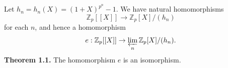 Let $h_n = h_n(X) = (1+X)^{p^n} - 1$. We have natural homomorphisms
$$\mathbb{Z}_p[[X]] \to \mathbb{Z}_p[X]/(h_n)$$
for each $n$, and hence a homomorphism
$$e: \mathbb{Z}_p[[X]] \to \varprojlim_n \mathbb{Z}_p[X]/(h_n).$$
\textbf{Theorem 1.1.} The homomorphism $e$ is an isomorphism.

